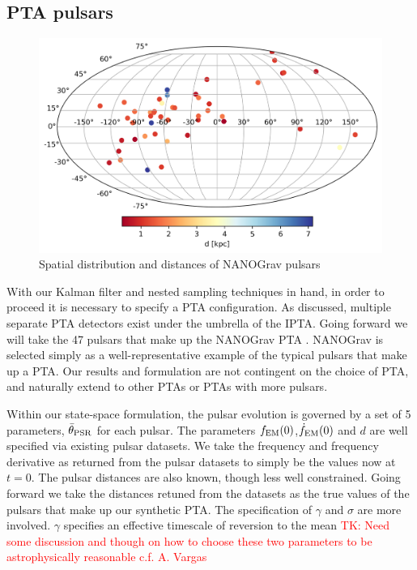 \documentclass[fleqn,usenatbib,useAMS]{mnras}
\begin{document}
\subsection{PTA pulsars}\label{sec:pta_pulsars}
\begin{figure}
	\includegraphics[width=0.8\columnwidth]{images/pulsars}
	\caption{Spatial distribution and distances of NANOGrav pulsars}
	\label{fig:pulsar_distrib}
\end{figure}
\noindent With our Kalman filter and nested sampling techniques in hand, in order to proceed it is necessary to specify a PTA configuration. As discussed, multiple separate PTA detectors exist under the umbrella of the IPTA. Going forward we will take the 47 pulsars that make up the NANOGrav PTA \citep{2020ApJ...905L..34A}. NANOGrav is selected simply as a well-representative example of the typical pulsars that make up a PTA. Our results and formulation are not contingent on the choice of PTA, and naturally extend to other PTAs or PTAs with more pulsars.  \newline 



\noindent Within our state-space formulation, the pulsar evolution is governed by a set of 5 parameters, $\bar{\theta}_{\rm PSR}$ for each pulsar. The parameters $f_{\rm EM} (0) $,$ \dot{f}_{\rm EM} (0)$ and $d$ are well specified via existing pulsar datasets. We take the frequency and frequency derivative as returned from the pulsar datasets to simply be the values now at $t=0$. The pulsar distances are also known, though less well constrained. Going forward we take the distances retuned from the datasets as the true values of the pulsars that make up our synthetic PTA. The specification of $\gamma$ and $\sigma$ are more involved. $\gamma$ specifies an effective timescale of reversion to the mean \textcolor{red}{TK: Need some discussion and though on how to choose these two parameters to be astrophysically reasonable c.f. A. Vargas}
\end{document}
